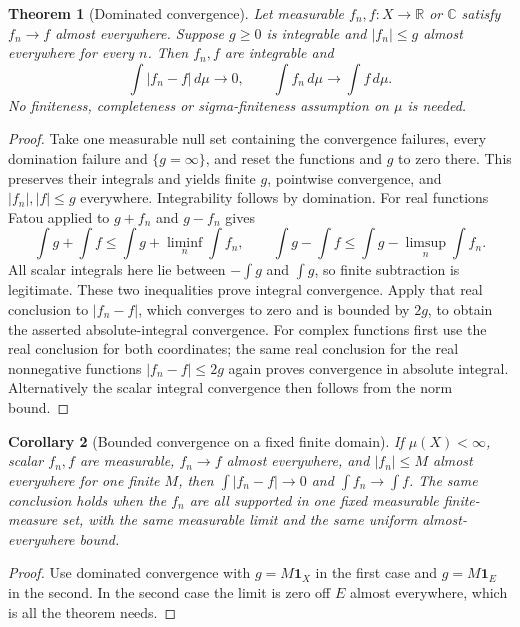 \documentclass[11pt,oneside,openany]{book}
\newtheorem{theorem}{Theorem}[chapter]
\newtheorem{corollary}[theorem]{Corollary}
\theoremstyle{definition}
\theoremstyle{remark}
\newcommand{\R}{\mathbb R}\newcommand{\C}{\mathbb C}
\newcommand{\one}{\mathbf1}\newcommand{\ind}[1]{\mathbf1_{#1}}
\newcommand{\family}[1]{}
\begin{document}
\begin{theorem}[Dominated convergence]
\family{D11.06.dominated_convergence}\label{d11:06:dominated-convergence}
Let measurable $f_n,f:X\to\R$ or $\C$ satisfy $f_n\to f$ almost
everywhere. Suppose $g\geq0$ is integrable and $|f_n|\leq g$ almost
everywhere for every $n$. Then $f_n,f$ are integrable and
\[
 \int|f_n-f|\,d\mu\longrightarrow0,
 \qquad \int f_n\,d\mu\longrightarrow\int f\,d\mu.
\]
No finiteness, completeness or sigma-finiteness assumption on $\mu$ is needed.
\end{theorem}
\begin{proof}
Take one measurable null set containing the convergence failures, every
domination failure and $\{g=\infty\}$, and reset the functions and $g$ to
zero there. This preserves their integrals and yields finite $g$, pointwise
convergence, and $|f_n|,|f|\leq g$ everywhere. Integrability follows by
domination. For real functions Fatou applied to $g+f_n$ and $g-f_n$ gives
\[
 \int g+\int f\leq\int g+\liminf_n\int f_n,
 \qquad
 \int g-\int f\leq\int g-\limsup_n\int f_n.
\]
All scalar integrals here lie between $-\int g$ and $\int g$, so finite
subtraction is legitimate. These two inequalities prove integral
convergence. Apply that real conclusion to $|f_n-f|$, which converges to
zero and is bounded by $2g$, to obtain the asserted absolute-integral
convergence. For complex functions first use the real conclusion for both
coordinates; the same real conclusion for the real nonnegative functions
$|f_n-f|\leq2g$ again proves convergence in absolute integral. Alternatively
the scalar integral convergence then follows from the norm bound.
\end{proof}

\begin{corollary}[Bounded convergence on a fixed finite domain]
\family{D11.06.bounded_convergence}\label{d11:06:bounded-convergence}
If $\mu(X)<\infty$, scalar $f_n,f$ are measurable, $f_n\to f$ almost everywhere, and
$|f_n|\leq M$ almost everywhere for one finite $M$, then
$\int|f_n-f|\to0$ and $\int f_n\to\int f$. The same conclusion holds
when the $f_n$ are all supported in one fixed measurable finite-measure set,
with the same measurable limit and the same uniform almost-everywhere bound.
\end{corollary}
\begin{proof}
Use dominated convergence with $g=M\one_X$ in the first case and
$g=M\one_E$ in the second. In the second case the limit is zero off $E$
almost everywhere, which is all the theorem needs.
\end{proof}
\end{document}
